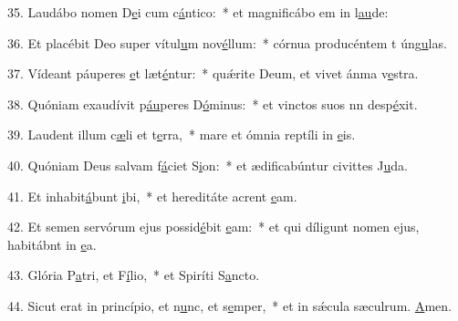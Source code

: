 35. Laudábo nomen D\uline{e}i cum c\uline{á}ntico:~* et magnificábo em in l\uline{au}de:\par 
36. Et placébit Deo super vítul\uline{u}m nov\uline{é}llum:~* córnua producéntem t úng\uline{u}las.\par 
37. Vídeant páuperes \uline{e}t læt\uline{é}ntur:~* quǽrite Deum, et vivet ánma v\uline{e}stra.\par 
38. Quóniam exaudívit p\uline{áu}peres D\uline{ó}minus:~* et vinctos suos nn desp\uline{é}xit.\par 
39. Laudent illum c\uline{æ}li et t\uline{e}rra,~* mare et ómnia reptíli in \uline{e}is.\par 
40. Quóniam Deus salvam f\uline{á}ciet S\uline{i}on:~* et ædificabúntur civittes J\uline{u}da.\par 
41. Et inhabit\uline{á}bunt \uline{i}bi,~* et hereditáte acrent \uline{e}am.\par 
42. Et semen servórum ejus possid\uline{é}bit \uline{e}am:~* et qui díligunt nomen ejus, habitábnt in \uline{e}a.\par 
43. Glória P\uline{a}tri, et F\uline{í}lio,~* et Spiríti S\uline{a}ncto.\par 
44. Sicut erat in princípio, et n\uline{u}nc, et s\uline{e}mper,~* et in sǽcula sæculrum. \uline{A}men.\par 
